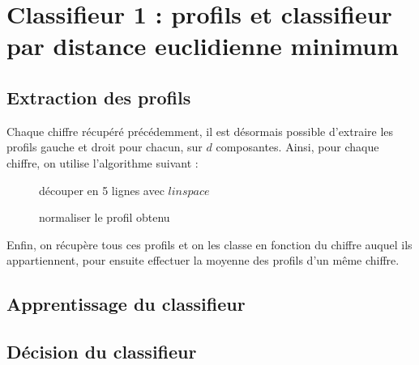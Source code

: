 \section{Classifieur 1 : profils et classifieur par distance euclidienne minimum}

\subsection{Extraction des profils}
Chaque chiffre récupéré précédemment, il est désormais possible d'extraire les profils gauche et droit pour chacun, sur $d$ composantes. Ainsi, pour chaque chiffre, on utilise l'algorithme suivant :

\begin{figure}[h]
\begin{algorithm}[H]
	découper en 5 lignes avec $linspace$
	
	normaliser le profil obtenu
\end{algorithm}
\end{figure}

Enfin, on récupère tous ces profils et on les classe en fonction du chiffre auquel ils appartiennent, pour ensuite effectuer la moyenne des profils d'un même chiffre.

\subsection{Apprentissage du classifieur}

\subsection{Décision du classifieur}